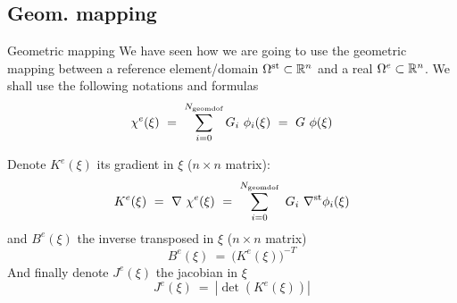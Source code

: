 \subsection{Geom. mapping}
\label{sec:geom.-mapping}
\begin{frame}{Geometric mapping}
  We have seen how we are going to use the geometric mapping between a
  reference element/domain ${\Omega^{\text{st}}} \subset {\ensuremath{\mathbb{R}^{n}}}$ and a real ${\Omega^{e}} \subset {\ensuremath{\mathbb{R}^{n}}}$.
  We shall use the following notations  and formulas
  \begin{equation}
    \label{eq:66}
    \chi^e( \xi )\ =\ \sum_{i=0}^{\ngdof} G_i\ \phi_i (\xi)\ =\ G\ \phi(\xi) 
  \end{equation}
  
  Denote $K^e(\xi)$ its gradient in $\xi$ ($n\times n$ matrix):
  \begin{equation}
    \label{eq:67}
    K^e( \xi )\ =\ \nabla\ \chi^e (\xi )\ =\ \sum_{i=0}^{\ngdof}\ G_i\ \nabla^{\text{st}} \phi_i (\xi)
  \end{equation}
  and $B^e(\xi)$ the inverse transposed in $\xi$ ($n\times n$ matrix)
  \begin{equation}
    \label{eq:68}
    B^e( \xi )\ =\ \Big(K^e(\xi)\Big)^{-T}
  \end{equation}
  And finally denote $J^e(\xi)$ the jacobian in $\xi$
  \begin{equation}
    \label{eq:69}
    J^e(\xi)\ =\ |\det( K^e(\xi) )|
  \end{equation}
\end{frame}

